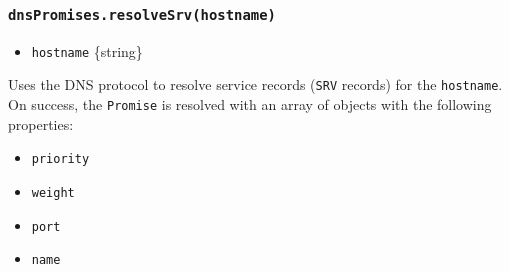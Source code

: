 \begin{Shaded}
\begin{Highlighting}[]
\NormalTok{\{}
  \OperatorTok{:} \OperatorTok{,}
  \OperatorTok{:} \OperatorTok{,}
  \OperatorTok{:} \OperatorTok{,}
  \OperatorTok{:} \OperatorTok{,}
  \OperatorTok{:} \OperatorTok{,}
  \OperatorTok{:} \OperatorTok{,}
  \OperatorTok{:} 
\NormalTok{\}}
\end{Highlighting}
\end{Shaded}

\subsubsection{\texorpdfstring{\texttt{dnsPromises.resolveSrv(hostname)}}{dnsPromises.resolveSrv(hostname)}}\label{dnspromises.resolvesrvhostname}

\begin{itemize}
\tightlist
\item
  \texttt{hostname} \{string\}
\end{itemize}

Uses the DNS protocol to resolve service records (\texttt{SRV} records)
for the \texttt{hostname}. On success, the \texttt{Promise} is resolved
with an array of objects with the following properties:

\begin{itemize}
\tightlist
\item
  \texttt{priority}
\item
  \texttt{weight}
\item
  \texttt{port}
\item
  \texttt{name}
\end{itemize}

\begin{Shaded}
\begin{Highlighting}[]
\NormalTok{\{}
  \OperatorTok{:} \OperatorTok{,}
  \OperatorTok{:} \OperatorTok{,}
  \OperatorTok{:} \OperatorTok{,}
  \OperatorTok{:} 
\NormalTok{\}}
\end{Highlighting}
\end{Shaded}

